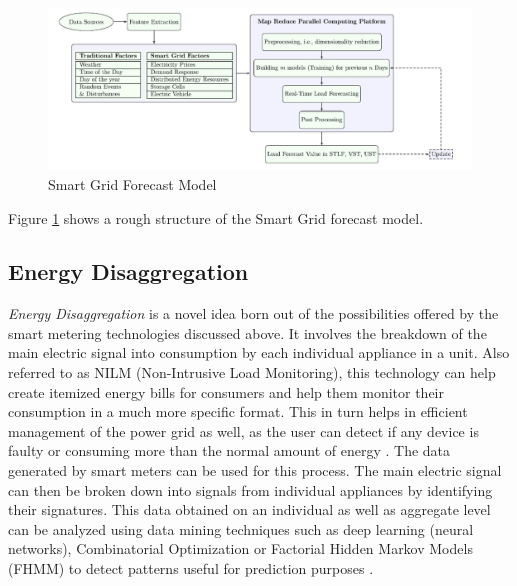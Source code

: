 \begin{figure}
	\includegraphics[width=1.0\columnwidth]{images/sg_forecast.jpg}
	\caption{Smart Grid Forecast Model \cite{george07}}
	\label{F:forecast}
\end{figure}
Figure \ref{F:forecast} shows a rough structure of the Smart Grid forecast model.

\subsection{Energy Disaggregation}
{\em Energy Disaggregation} is a novel idea born out of the possibilities offered by the smart metering technologies discussed above. It involves the breakdown of the main electric signal into consumption by each individual appliance in a unit. Also referred to as NILM (Non-Intrusive Load Monitoring), this technology can help create itemized energy bills for consumers and help them monitor their consumption in a much more specific format. This in turn helps in efficient management of the power grid as well, as the user can detect if any device is faulty or consuming more than the normal amount of energy \cite{wan08}. The data generated by smart meters can be used for this process. The main electric signal can then be broken down into signals from individual appliances by identifying their signatures. This data obtained on an individual as well as aggregate level can be analyzed using data mining techniques such as deep learning (neural networks), Combinatorial Optimization or Factorial Hidden Markov Models (FHMM) to detect patterns useful for prediction purposes \cite{wan08}.

